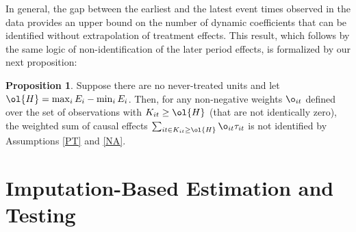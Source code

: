 \documentclass[12pt]{article}
\newcommand{\CiteReference}{../Notes/reference.bib}
\theoremstyle{definition}
\newtheorem{proposition}{Proposition}
\begin{document}
In general, the gap between the earliest and the latest event times observed in the data provides an upper bound on the number of dynamic coefficients that can be identified without extrapolation of treatment effects. This result, which follows by the same logic of non-identification of the later period effects, is formalized by our next proposition:

\begin{proposition}
    Suppose there are no never-treated units and let $\ol{H} = \max_i E_i - \min_i E_i$. Then, for any non-negative weights $\o_{it}$ defined over the set of observations with $K_{it} \geq \ol{H}$ (that are not identically zero), the weighted sum of causal effects $\sum_{it \in K_{it} \geq \ol{H}} \o_{it} \tau_{it}$ is not identified by Assumptions \ref{PT} and \ref{NA}.
\end{proposition}

\section{Imputation-Based Estimation and Testing}






\end{document}
